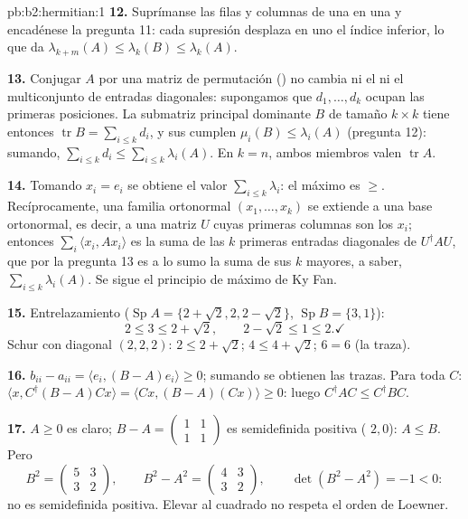 \begin{solution}{pb:b2:hermitian:1}
\textbf{12.} Suprímanse las filas y columnas de una en una y
encadénese la pregunta 11: cada supresión desplaza en uno el índice
inferior, lo que da $\lambda_{k+m}(A) \leq \lambda_k(B) \leq
\lambda_k(A)$.

\textbf{13.} Conjugar $A$ por una matriz de permutación () no
cambia ni el  ni el multiconjunto de entradas diagonales:
supongamos que $d_1, \dots, d_k$ ocupan las primeras posiciones. La
submatriz principal dominante $B$ de tamaño $k\times k$ tiene
entonces $\operatorname{tr} B = \sum_{i\leq k}d_i$, y sus
 cumplen $\mu_i(B) \leq \lambda_i(A)$ (pregunta 12):
sumando, $\sum_{i\leq k}d_i \leq \sum_{i\leq k}\lambda_i(A)$. En $k =
n$, ambos miembros valen $\operatorname{tr} A$.

\textbf{14.} Tomando $x_i = e_i$ se obtiene el valor $\sum_{i\leq
k}\lambda_i$: el máximo es $\geq$. Recíprocamente, una familia
ortonormal $(x_1, \dots, x_k)$ se extiende a una base ortonormal, es
decir, a una matriz  $U$ cuyas primeras columnas son los
$x_i$; entonces $\sum_i\langle x_i, Ax_i\rangle$ es la suma de las
$k$ primeras entradas diagonales de $U^\dagger AU$, que por la
pregunta 13 es a lo sumo la suma de sus $k$  mayores,
a saber, $\sum_{i\leq k}\lambda_i(A)$. Se sigue el principio de
máximo de Ky Fan.

\textbf{15.} Entrelazamiento ($\operatorname{Sp}A = \{2+\sqrt2, 2,
2-\sqrt2\}$, $\operatorname{Sp}B = \{3, 1\}$):
\[
2 \leq 3 \leq 2 + \sqrt2,
\qquad
2 - \sqrt2 \leq 1 \leq 2 . \checkmark
\]
Schur con diagonal $(2,2,2)$: $2 \leq 2+\sqrt2$; $4 \leq 4 +
\sqrt2$; $6 = 6$ (la traza). \checkmark

\textbf{16.} $b_{ii} - a_{ii} = \langle e_i, (B-A)e_i\rangle \geq 0$;
sumando se obtienen las trazas. Para toda $C$: $\langle x,
C^\dagger(B - A)Cx\rangle = \langle Cx, (B-A)(Cx)\rangle \geq 0$:
luego $C^\dagger AC \leq C^\dagger BC$.

\textbf{17.} $A \geq 0$ es claro; $B - A = \begin{pmatrix} 1 & 1\\ 1
& 1\end{pmatrix}$ es semidefinida positiva ( $2, 0$):
$A \leq B$. Pero
\[
B^2 = \begin{pmatrix} 5 & 3\\ 3 & 2\end{pmatrix},
\qquad
B^2 - A^2 = \begin{pmatrix} 4 & 3\\ 3 & 2\end{pmatrix},
\qquad \det(B^2 - A^2) = -1 < 0 :
\]
no es semidefinida positiva. Elevar al cuadrado no respeta el orden
de Loewner.


\end{solution}
